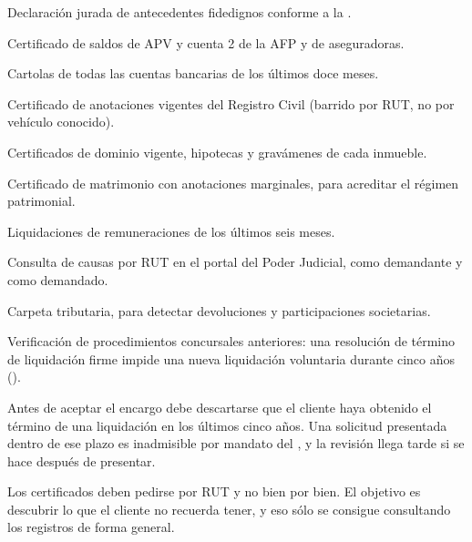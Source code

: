 \bloqueDocumental

\begin{checklist}
  \item Declaración jurada de antecedentes fidedignos conforme a la 
  \parencite{ncg-22}.
  \item Certificado de saldos de APV y cuenta 2 de la AFP y de aseguradoras.
  \item Cartolas de todas las cuentas bancarias de los últimos doce meses.
  \item Certificado de anotaciones vigentes del Registro Civil (barrido por RUT, no por
  vehículo conocido).
  \item Certificados de dominio vigente, hipotecas y gravámenes de cada inmueble.
  \item Certificado de matrimonio con anotaciones marginales, para acreditar el régimen
  patrimonial.
  \item Liquidaciones de remuneraciones de los últimos seis meses.
  \item Consulta de causas por RUT en el portal del Poder Judicial, como demandante y
  como demandado.
  \item Carpeta tributaria, para detectar devoluciones y participaciones societarias.
  \item Verificación de procedimientos concursales anteriores: una resolución de término de
  liquidación firme impide una nueva liquidación voluntaria durante cinco años
  ().
\end{checklist}

\begin{alerta}
Antes de aceptar el encargo debe descartarse que el cliente haya obtenido el término de una
liquidación en los últimos cinco años. Una solicitud presentada dentro de ese plazo es
inadmisible por mandato del , y la revisión llega tarde si se hace después de
presentar.
\end{alerta}

\begin{alerta}
Los certificados deben pedirse por RUT y no bien por bien. El objetivo es descubrir lo
que el cliente no recuerda tener, y eso sólo se consigue consultando los registros de
forma general.
\end{alerta}

